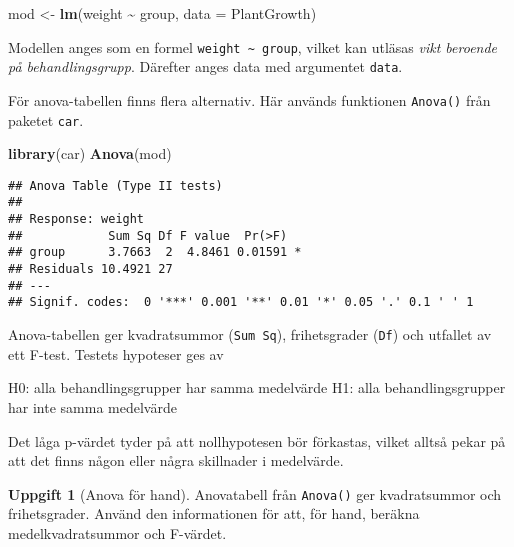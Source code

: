 \documentclass[
]{book}
\newenvironment{Shaded}{\begin{snugshade}}{\end{snugshade}}
\newcommand{\AttributeTok}[1]{\textcolor[rgb]{0.13,0.29,0.53}{#1}}
\newcommand{\FunctionTok}[1]{\textcolor[rgb]{0.13,0.29,0.53}{\textbf{#1}}}
\newcommand{\NormalTok}[1]{#1}
\newcommand{\OtherTok}[1]{\textcolor[rgb]{0.56,0.35,0.01}{#1}}
\newcommand{\SpecialCharTok}[1]{\textcolor[rgb]{0.81,0.36,0.00}{\textbf{#1}}}
\theoremstyle{definition}
\theoremstyle{definition}
\theoremstyle{definition}
\newtheorem{exercise}{Uppgift}[chapter]
\theoremstyle{definition}
\theoremstyle{remark}
\begin{document}
\begin{Shaded}
\begin{Highlighting}[]
\NormalTok{mod }\OtherTok{\textless{}{-}} \FunctionTok{lm}\NormalTok{(weight }\SpecialCharTok{\textasciitilde{}}\NormalTok{ group, }\AttributeTok{data =}\NormalTok{ PlantGrowth)}
\end{Highlighting}
\end{Shaded}

Modellen anges som en formel \texttt{weight\ \textasciitilde{}\ group}, vilket kan utläsas \emph{vikt beroende på behandlingsgrupp}. Därefter anges data med argumentet \texttt{data}.

För anova-tabellen finns flera alternativ. Här används funktionen \texttt{Anova()} från paketet \texttt{car}.

\begin{Shaded}
\begin{Highlighting}[]
\FunctionTok{library}\NormalTok{(car)}
\FunctionTok{Anova}\NormalTok{(mod)}
\end{Highlighting}
\end{Shaded}

\begin{verbatim}
## Anova Table (Type II tests)
## 
## Response: weight
##            Sum Sq Df F value  Pr(>F)  
## group      3.7663  2  4.8461 0.01591 *
## Residuals 10.4921 27                  
## ---
## Signif. codes:  0 '***' 0.001 '**' 0.01 '*' 0.05 '.' 0.1 ' ' 1
\end{verbatim}

Anova-tabellen ger kvadratsummor (\texttt{Sum\ Sq}), frihetsgrader (\texttt{Df}) och utfallet av ett F-test. Testets hypoteser ges av

H0: alla behandlingsgrupper har samma medelvärde
H1: alla behandlingsgrupper har inte samma medelvärde

Det låga p-värdet tyder på att nollhypotesen bör förkastas, vilket alltså pekar på att det finns någon eller några skillnader i medelvärde.

\begin{exercise}[Anova för hand]
Anovatabell från \texttt{Anova()} ger kvadratsummor och frihetsgrader. Använd den informationen för att, för hand, beräkna medelkvadratsummor och F-värdet.
\end{exercise}
\end{document}
